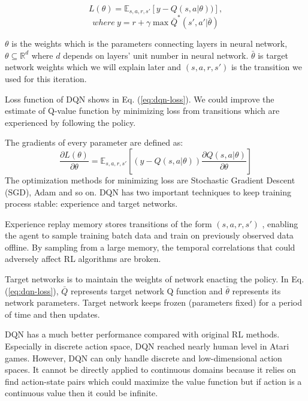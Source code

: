 \documentclass[11pt,twocolumn]{jarticle} %
\begin{document}
\begin{equation} \label{eq:dqn-loss}
L(\theta) = \mathbb{E}_{s,a,r,s'}[y - Q(s, a|\theta))],  
\end{equation}
$$where \ y = r + \gamma\max \bar{Q}^*(s', a'|\bar{\theta})$$

$\theta$ is the weights which is the parameters connecting layers in neural network, $\theta \subseteq \mathbb{R}^d$ where $d$ depends on layers' unit number in neural network. $\bar{\theta}$ is target network weights which we will explain later and $(s,a,r,s')$ is the transition we used for this iteration. \par

Loss function of DQN shows in Eq. (\ref{eq:dqn-loss}). We could improve the estimate of Q-value function by minimizing loss from transitions which are experienced by following the policy. \par
The gradients of every parameter are defined as:
\begin{equation}
\frac{\partial L(\theta)}{\partial \theta} = \mathbb{E}_{s,a,r,s'}[(y - Q(s, a|\theta))\frac{\partial Q(s, a|\theta)}{\partial \theta}]
\end{equation}
The optimization methods for minimizing loss are Stochastic Gradient Descent (SGD), Adam\cite{adam} and so on.
DQN has two important techniques to keep training process stable: experience and target networks.\par
Experience replay\cite{replay} memory stores transitions of the form $(s,a,r,s')$ , enabling the agent to sample training batch data and train on previously observed data offline. By sampling from a large memory, the temporal correlations that could adversely affect RL algorithms are broken. \par
Target networks\cite{qlearning} is to maintain the weights of network enacting the policy. In Eq. (\ref{eq:dqn-loss}), $\bar{Q}$ represents target network Q function and $\bar{\theta}$ represents its network parameters. Target network keeps frozen (parameters fixed) for a period of time and then updates. \par

DQN has a much better performance compared with original RL methods. Especially in discrete action space, DQN reached nearly human level in Atari games. However, DQN can only handle discrete and low-dimensional action spaces. It cannot be directly applied to continuous domains because it relies on find action-state pairs which could maximize the value function but if action is a continuous value then it could be infinite. \par
\end{document}
